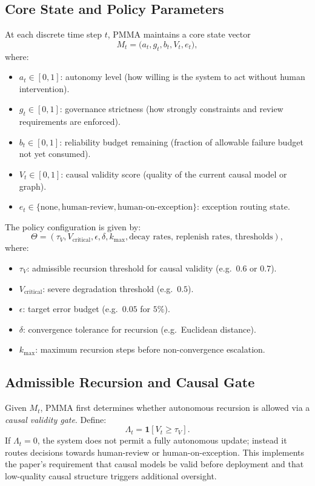 \documentclass[11pt]{article}
\begin{document}
\subsection{Core State and Policy Parameters}

At each discrete time step $t$, PMMA maintains a core state vector
\[
  M_t = \bigl(a_t, g_t, b_t, V_t, e_t\bigr),
\]
where:
\begin{itemize}
  \item $a_t \in [0,1]$: autonomy level (how willing is the system to act without human intervention).
  \item $g_t \in [0,1]$: governance strictness (how strongly constraints and review requirements are enforced).
  \item $b_t \in [0,1]$: reliability budget remaining (fraction of allowable failure budget not yet consumed).
  \item $V_t \in [0,1]$: causal validity score (quality of the current causal model or graph).
  \item $e_t \in \{\text{none},\text{human-review},\text{human-on-exception}\}$: exception routing state.
\end{itemize}

The policy configuration is given by:
\[
  \Theta = (\tau_V, V_\mathrm{critical}, \epsilon, \delta, k_\mathrm{max}, \text{decay rates, replenish rates, thresholds}),
\]
where:
\begin{itemize}
  \item $\tau_V$: admissible recursion threshold for causal validity (e.g.\ $0.6$ or $0.7$).
  \item $V_\mathrm{critical}$: severe degradation threshold (e.g.\ $0.5$).
  \item $\epsilon$: target error budget (e.g.\ $0.05$ for $5\%$).
  \item $\delta$: convergence tolerance for recursion (e.g.\ Euclidean distance).
  \item $k_\mathrm{max}$: maximum recursion steps before non-convergence escalation.
\end{itemize}

\subsection{Admissible Recursion and Causal Gate}

Given $M_t$, PMMA first determines whether autonomous recursion is allowed via a \emph{causal validity gate}.
Define:
\[
  \Lambda_t = \mathbf{1}[V_t \ge \tau_V].
\]
If $\Lambda_t = 0$, the system does not permit a fully autonomous update; instead it routes decisions towards human-review or human-on-exception.
This implements the paper's requirement that causal models be valid before deployment and that low-quality causal structure triggers additional oversight.
\end{document}
